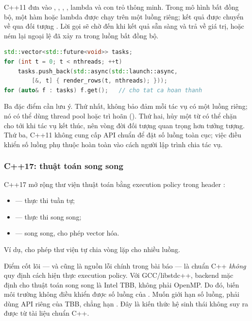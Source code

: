 C++11 đưa vào , , ,
, lambda và con trỏ thông minh. Trong mô hình bất đồng bộ,
một hàm hoặc lambda được chạy trên một luồng riêng; kết quả được chuyển về qua
đối tượng . Lời gọi  sẽ chờ đến khi kết
quả sẵn sàng và trả về giá trị, hoặc ném lại ngoại lệ đã xảy ra trong luồng bất
đồng bộ.

\begin{lstlisting}[language=C++,caption={Mẫu bất đồng bộ với \code{std::async} và \code{std::future}.},label={lst:async}]
std::vector<std::future<void>> tasks;
for (int t = 0; t < nthreads; ++t)
    tasks.push_back(std::async(std::launch::async,
        [&, t] { render_rows(t, nthreads); }));
for (auto& f : tasks) f.get();   // cho tat ca hoan thanh
\end{lstlisting}

Ba đặc điểm cần lưu ý. Thứ nhất,  không bảo đảm mỗi tác vụ có
một luồng riêng; nó có thể dùng thread pool hoặc trì hoãn ().
Thứ hai, hủy một  từ  có thể chặn cho tới khi
tác vụ kết thúc, nên vòng đời đối tượng quan trọng hơn tưởng tượng. Thứ ba, C++11
không cung cấp API chuẩn để đặt số luồng toàn cục; việc điều khiển số luồng phụ
thuộc hoàn toàn vào cách người lập trình chia tác vụ.

\subsubsection{C++17: thuật toán song song}

C++17 mở rộng thư viện thuật toán bằng execution policy trong header
:
\begin{itemize}
  \item {} — thực thi tuần tự;
  \item {} — thực thi song song;
  \item {} — song song, cho phép vector hóa.
\end{itemize}
Ví dụ, 
cho phép thư viện tự chia vòng lặp cho nhiều luồng.

Điểm cốt lõi — và cũng là nguồn lỗi chính trong bài báo — là chuẩn C++ \emph{không}
quy định cách hiện thực execution policy. Với GCC/libstdc++, backend mặc định cho
thuật toán song song là Intel TBB, không phải OpenMP. Do đó, biến môi trường
 không điều khiển được số luồng của
. Muốn giới hạn số luồng, phải dùng API riêng của TBB,
chẳng hạn . Đây là kiến thức hệ sinh thái không suy ra
được từ tài liệu chuẩn C++.

